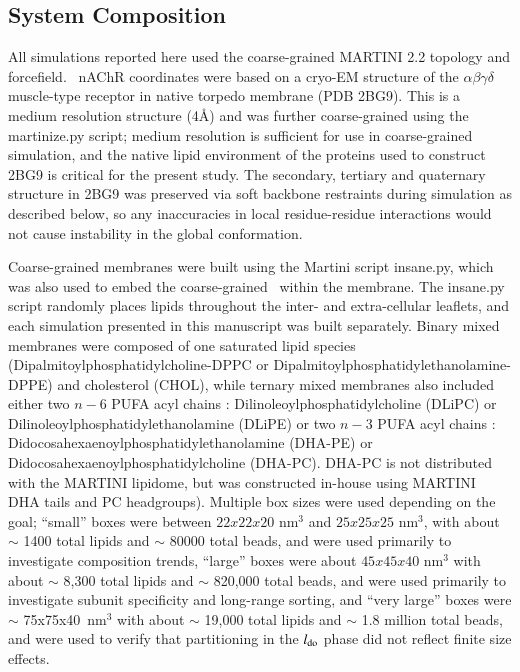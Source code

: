 \subsection{System Composition}

All simulations reported here used the coarse-grained MARTINI 2.2\cite{martini} topology and forcefield.%
~nAChR coordinates were based on a cryo-EM structure of the $\alpha{\beta}\gamma\delta$ muscle-type receptor in native torpedo membrane (PDB 2BG9\cite{Unwin_Refined_2005}). This is a medium resolution structure (4\AA) and was further coarse-grained using the martinize.py script; medium resolution is sufficient for use in coarse-grained simulation, and the native lipid environment of the proteins used to construct 2BG9 is critical for the present study. The secondary, tertiary and quaternary structure in 2BG9 was preserved via soft backbone restraints during simulation as described below, so any inaccuracies in local residue-residue interactions would not cause instability in the global conformation.  

Coarse-grained membranes were built using the Martini script insane.py, which was also used to embed the coarse-grained \nachr~within the membrane. The insane.py script randomly places lipids throughout the inter- and extra-cellular leaflets, and each simulation presented in this manuscript was built separately.  Binary mixed membranes were composed of one saturated lipid species (Dipalmitoylphosphatidylcholine-DPPC or Dipalmitoylphosphatidylethanolamine-DPPE) and cholesterol (CHOL), while ternary mixed membranes also included either two $n-6$ PUFA acyl chains : Dilinoleoylphosphatidylcholine (DLiPC) or Dilinoleoylphosphatidylethanolamine (DLiPE) or two $n-3$ PUFA acyl chains : Didocosahexaenoylphosphatidylethanolamine (DHA-PE) or Didocosahexaenoylphosphatidylcholine (DHA-PC). DHA-PC is not distributed with the MARTINI lipidome, but was constructed in-house using MARTINI DHA tails and PC headgroups). Multiple box sizes were used depending on the goal;  ``small'' boxes were between $22x22x20$ nm$^3$ and $25x25x25$ nm$^3$, with about {$\sim$ 1400} total lipids and {$\sim$ 80000} total beads, and were used primarily to investigate composition trends, ``large'' boxes were about $45x45x40$ nm$^3$ with about {$\sim$ 8,300} total lipids and {$\sim$ 820,000} total beads, and were used primarily to investigate subunit specificity and long-range sorting, and ``very large'' boxes were $\sim$ 75x75x40~nm$^3$ with about {$\sim$ 19,000} total lipids and {$\sim$ 1.8 million} total beads, and were used to verify that partitioning in the $l_{\mathrm{do}}$ phase did not reflect finite size effects.  

